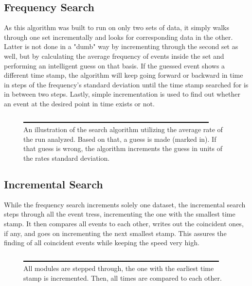       \subsection{Frequency Search}
      \label{ch:Analysis software:sec:Search algorithms:subsec:Frequency Search}
      As this algorithm was built to run on only two sets of data, it simply walks through one set incrementally and looks for corresponding data in the other. Latter is not done in a "dumb" way by incrementing through the second set as well, but by calculating the average frequency of events inside the set and performing an intelligent guess on that basis. If the guessed event shows a different time stamp, the algorithm will keep going forward or backward in time in steps of the frequency's standard deviation until the time stamp searched for is in between two steps. Lastly, simple incrementation is used to find out whether an event at the desired point in time exists or not.
      \begin{figure}
	\centering
      	\includegraphics[width = 0.9\textwidth]{graphics/frequencySearch.eps}
      	\caption[Frequency search algorithm]{An illustration of the search algorithm utilizing the average rate of the run analyzed. Based on that, a guess is made (marked in). If that guess is wrong, the algorithm increments the guess in units of the rates standard deviation.}
      \end{figure}
      \subsection{Incremental Search}
      \label{ch:Analysis software:sec:Search algorithms:subsec: Incremental Search}
      While the frequency search increments solely one dataset, the incremental search steps through all the event tress, incrementing the one with the smallest time stamp. It then compares all events to each other, writes out the coincident ones, if any, and goes on incrementing the next smallest stamp. This assures the finding of all coincident events while keeping the speed very high.
      \begin{figure}
	\centering
      	\includegraphics[width = 0.9 \textwidth]{graphics/incrementalSearch.eps}
      	\caption[Incremental search algorithm]{All modules are stepped through, the one with the earliest time stamp is incremented. Then, all times are compared to each other.}
      \end{figure} 
